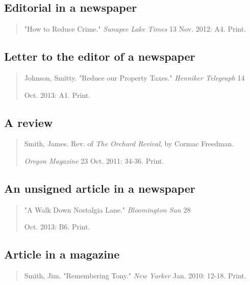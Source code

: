 \subsection{Editorial in a newspaper}
\begin{quote}
"How to Reduce Crime." \emph{Sunapee Lake Times} 13 Nov. 2012: A4. Print.
\end{quote}

\subsection{Letter to the editor of a newspaper}

\begin{quote}
Johnson, Smitty. "Reduce our Property Taxes." \emph{Henniker Telegraph} 14 

\hspace{.4in}Oct. 2013: A1. Print. 
\end{quote}

\subsection{A review}
\begin{quote}
Smith, James. Rev. of \emph{The Orchard Revival}, by Cormac Freedman. 

\hspace{.4in}\emph{Oregon Magazine} 23 Oct. 2011: 34-36. Print. 
\end{quote}

\subsection{An unsigned article in a newspaper}

\begin{quote}
"A Walk Down Nostalgia Lane." \emph{Bloomington Sun} 28 

\hspace{.4in}Oct. 2013: B6. Print. 
\end{quote}


\subsection{Article in a magazine}
\begin{quote}
Smith, Jim. "Remembering Tony." \emph{New Yorker} Jan. 2010: 12-18. Print.
\end{quote}


